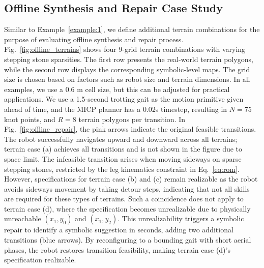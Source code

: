 \documentclass[letterpaper, 10 pt, conference]{ieeeconf}
\begin{document}
\subsection{Offline Synthesis and Repair Case Study}
Similar to Example~\ref{example:1}, we define additional terrain combinations for the purpose of evaluating offline synthesis and repair process. 
Fig.~\ref{fig:offline_terrains} shows four 9-grid terrain combinations with varying stepping stone sparsities. The first row presents the real-world terrain polygons, while the second row displays the corresponding symbolic-level maps. The grid size is chosen based on factors such as robot size and terrain dimensions. In all examples, we use a 0.6 m cell size, but this can be adjusted for practical applications. 
We use a 1.5-second trotting gait as the motion primitive given ahead of time, and the MICP planner has a 0.02s timestep, resulting in $N=75$ knot points, and $R=8$ terrain polygons per transition. In Fig.~\ref{fig:offline_repair}, the pink arrows indicate the original feasible transitions. The robot successfully navigates upward and downward across all terrains; terrain case (a) achieves all transitions and is not shown in the figure due to space limit. 
The infeasible transition arises when moving sideways on sparse stepping stones, restricted by the leg kinematics constraint in Eq.~\ref{eq:rom}. However, specifications for terrain case (b) and (c) remain realizable as the robot avoids sideways movement by taking detour steps, indicating that not all skills are required for these types of  terrains. Such a coincidence does not apply to terrain case (d), where the specification becomes unrealizable due to physically unreachable $(x_1,y_0)$ and $(x_1,y_2)$. This unrealizability triggers a symbolic repair to identify a symbolic suggestion in \todo seconds, adding two additional transitions (blue arrows). By reconfiguring to a bounding gait with short aerial phases, the robot restores transition feasibility, making terrain case (d)'s specification realizable.

\end{document}
